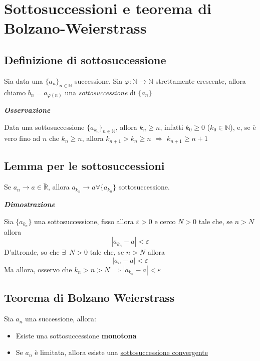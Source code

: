 \documentclass{article}
\theoremstyle{definition}
\newcommand{\R}{\mathbb{R}}
\newcommand{\N}{\mathbb{N}}
\begin{document}
\section{Sottosuccessioni e teorema di Bolzano-Weierstrass}
\subsection{Definizione di sottosuccessione}
Sia data una $\{a_n\}_{n \in \N}$ successione. Sia $\varphi: \N \to \N$ strettamente crescente, allora chiamo $b_n=a_{\varphi(n)}$ una \textit{sottosuccessione} di $\{a_n\}$
\begin{center}
    \textbf{\textit{Osservazione}}
\end{center}
Data una sottosuccessione $\{a_{k_n}\}_{n \in \N}$, allora $k_n \geqslant n$, infatti $k_0 \geqslant 0$ ($k_0 \in \N$), e, se è vero fino ad $n$ che $k_n \geqslant n$, allora $k_{n+1} > k_n \geqslant n$ $\Longrightarrow$ $k_{n+1} \geqslant n+1$
\subsection{Lemma per le sottosuccessioni}
Se $a_n \to a \in \tilde{\R}$, allora $a_{k_n} \to a \forall \{a_{k_n}\}$ sottosuccessione.
\begin{center}
    \textbf{\textit{Dimostrazione}}
\end{center}
Sia $\{a_{k_n}\}$ una sottosuccessione, fisso allora $\varepsilon > 0$ e cerco $N>0$ tale che, se $n > N$ allora
\begin{equation*}
    |a_{k_n}-a|< \varepsilon
\end{equation*}
D'altronde, so che $\exists \,\,\, N > 0$ tale che, se $n > N$ allora
\begin{equation*}
    |a_n-a| < \varepsilon
\end{equation*}
Ma allora, osservo che $k_n > n > N \,\, \Longrightarrow |a_{k_n}-a|< \varepsilon$


\subsection{Teorema di Bolzano Weierstrass}
    Sia $a_n$ una successione, allora:
    \begin{itemize}
        \item Esiste una sottosuccessione \textbf{monotona}
        \item Se $a_n$ è limitata, allora esiste una \underline{sottosuccessione convergente}
    \end{itemize}
\end{document}
